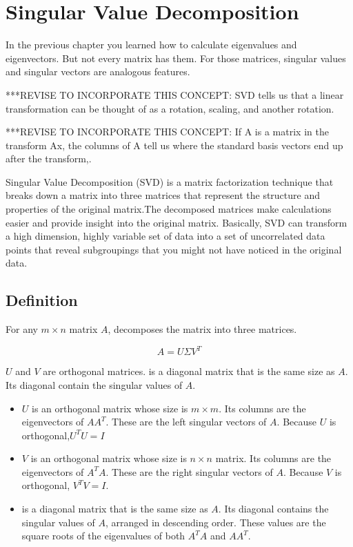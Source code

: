 \chapter{Singular Value Decomposition}

In the previous chapter you learned how to calculate eigenvalues and eigenvectors. But not every matrix has them. For those matrices, singular values and singular vectors are analogous features. 

***REVISE TO INCORPORATE THIS CONCEPT: SVD tells us that a linear transformation can be thought of as a rotation, scaling, and another rotation. 

***REVISE TO INCORPORATE THIS CONCEPT: If A is a matrix in the transform Ax, the columns of A tell us where the standard basis vectors end up after the transform,.



Singular Value Decomposition (SVD) is a matrix factorization technique that breaks down a matrix into three matrices that represent the structure and properties of the original matrix.The decomposed matrices make calculations easier and provide insight into the original matrix. Basically, SVD can transform a high dimension, highly variable set of data into a set of uncorrelated data points that reveal subgroupings that you might not have noticed in the original data.
 


\section{Definition}

For any $m \times n$ matrix $A$, decomposes the matrix into three matrices.

\begin{equation}
A = U \Sigma V^T
\end{equation}

$U$ and $V$ are orthogonal matrices. \Sigma is a diagonal matrix that is the same size as $A$. Its diagonal contain the singular values of $A$. 

\begin{itemize}
\item $U$ is an orthogonal matrix whose size is $m \times m$. Its columns are the
  eigenvectors of $AA^T$. These are the left singular vectors of $A$. Because $U$ is orthogonal,$U^TU = I$
\item $V$ is an orthogonal matrix whose size is $n \times n$ matrix. Its columns are the
  eigenvectors of $A^TA$. These are the right singular vectors of $A$. Because $V$ is orthogonal, $V^TV = I$.
\item  \Sigma is a diagonal matrix that is the same size as $A$. Its diagonal contains the singular values of $A$, arranged in descending order. These values are the square roots of the eigenvalues of both $A^TA$ and  $AA^T$. 
\end{itemize}

